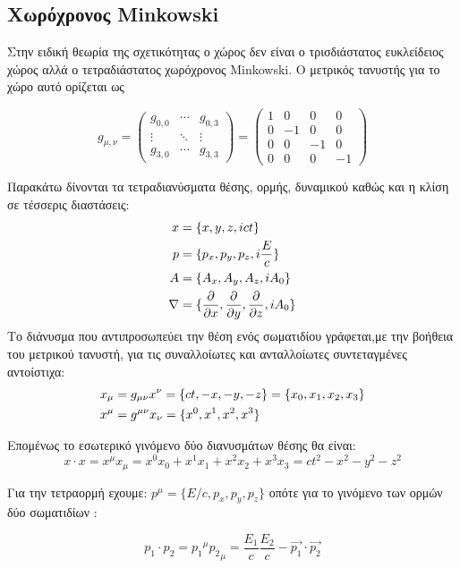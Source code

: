 \subsection{Χωρόχρονος \textlatin{Minkowski}}

Στην ειδική θεωρία της σχετικότητας ο χώρος δεν είναι ο τρισδιάστατος ευκλείδειος χώρος αλλά 
ο τετραδιάστατος χωρόχρονος \textlatin{Minkowski}. Ο μετρικός τανυστής για το χώρο αυτό ορίζεται ως 

\[
  g_{\mu,\nu} =
  \begin{pmatrix}
    g_{0,0}  & \cdots & g_{0,3} \\
    \vdots & \ddots & \vdots \\
    g_{3,0}  & \cdots & g_{3,3}
  \end{pmatrix}
  =
  \begin{pmatrix}
    1 & 0 & 0 & 0 \\
    0 & -1 & 0 & 0 \\
    0 & 0 & -1 & 0 \\
    0 & 0 & 0 &-1
  \end{pmatrix}
\]

Παρακάτω δίνονται τα τετραδιανύσματα θέσης, ορμής, δυναμικού καθώς και η κλίση σε τέσσερις διαστάσεις:
\begin{align*} 
  x &=\{x,y,z,ict\} 
  \\p &=\{p_x,p_y,p_z,i\frac{E}{c}\}
  \\A &=\{A_x,A_y,A_z,iA_0\}
  \\ \nabla &= \{\frac{\partial }{\partial x},\frac{\partial }{\partial y},\frac{\partial }{\partial z},iA_0\}
\end{align*} 
Το διάνυσμα που αντιπροσωπεύει την θέση ενός σωματιδίου γράφεται,με την βοήθεια του μετρικού τανυστή, για τις συναλλοίωτες και ανταλλοίωτες συντεταγμένες αντοίστιχα: 
\begin{align}
  \notag &x_{\mu}=g_{\mu \nu} x^\nu = \{ct,-x,-y,-z\} =\{x_0,x_1,x_2,x_3\}
  \\&x^{\mu}=g^{\mu \nu} x_\nu = \{x^0,x^1,x^2,x^3\}
  \label{dianisma}
\end{align}

Επομένως το εσωτερικό γινόμενο δύο διανυσμάτων θέσης θα είναι:
\[
  x \cdot x =x^\mu x_\mu =x^0 x_0 + x^1 x_1 + x^2 x_2 +x^3 x_3 = ct^2 -x^2-y^2-z^2  
\]

Για την τετραορμή εχουμε: $p^\mu =\{E/c,p_x,p_y,p_z\} $ οπότε για το γινόμενο των ορμών δύο σωματιδίων :

\begin{equation}
  p_1 \cdot p_2 = {p_1}^\mu {p_2}_\mu=\frac{E_1}{c} \frac{E_2}{c}-\vec{p_1}\cdot \vec{p_2} 
  \label{genrel2}
\end{equation}

